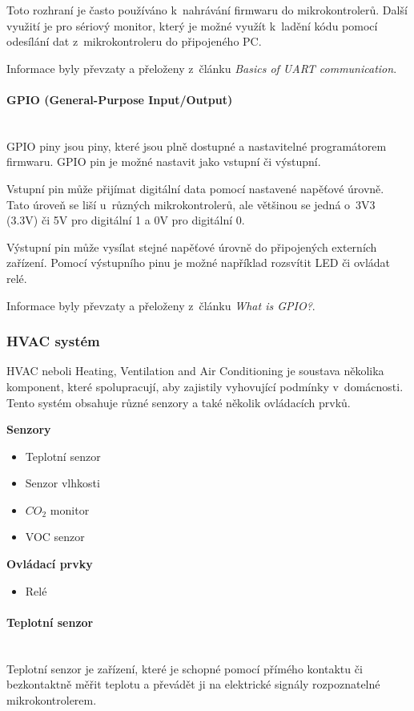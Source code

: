 Toto rozhraní je často používáno k~nahrávání firmwaru do mikrokontrolerů. Další využití je pro sériový monitor, který je možné využít k~ladění kódu pomocí odesílání dat z~mikrokontroleru do připojeného PC.

Informace byly převzaty a přeloženy z~článku \emph{Basics of UART communication}\cite{uart-basics}.

\paragraph*{GPIO (General-Purpose Input/Output)}\mbox{} \\
GPIO piny jsou piny, které jsou plně dostupné a nastavitelné programátorem firmwaru. GPIO pin je možné nastavit jako vstupní či výstupní. 

Vstupní pin může přijímat digitální data pomocí nastavené napěťové úrovně. Tato úroveň se liší u~různých mikrokontrolerů, ale většinou se jedná o~3V3 (3.3V) či 5V pro digitální 1 a 0V pro digitální 0.

Výstupní pin může vysílat stejné napěťové úrovně do připojených externích zařízení. Pomocí výstupního pinu je možné například rozsvítit LED či ovládat relé.

Informace byly převzaty a přeloženy z~článku \emph{What is GPIO?}\cite{gpio-basics}.

\subsubsection*{HVAC systém}
HVAC neboli Heating, Ventilation and Air Conditioning je soustava několika komponent, které spolupracují, aby zajistily vyhovující podmínky v~domácnosti\cite{hvac-system}. Tento systém obsahuje různé senzory a také několik ovládacích prvků.

\noindent\textbf{Senzory}
\begin{itemize}
  \item Teplotní senzor
  \item Senzor vlhkosti
  \item $CO_2$ monitor
  \item VOC senzor
  \end{itemize}

\noindent\textbf{Ovládací prvky}
\begin{itemize}
  \item Relé
  \end{itemize}

\paragraph*{Teplotní senzor}\mbox{} \\
Teplotní senzor je zařízení, které je schopné pomocí přímého kontaktu či bezkontaktně měřit teplotu a převádět ji na elektrické signály rozpoznatelné mikrokontrolerem.

